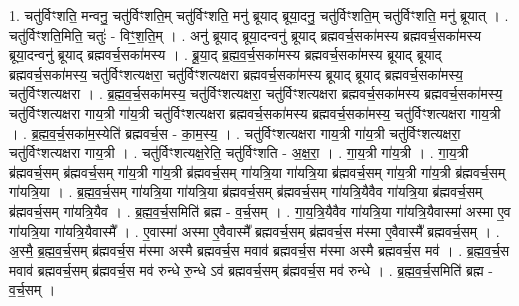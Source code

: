 \documentclass[17pt]{extarticle}
\begin{document}
1. चतु॑र्विꣳशति॒ मन्वनु॒ चतु॑र्विꣳशति॒म् चतु॑र्विꣳशति॒ मनु॑ ब्रूयाद् ब्रूया॒दनु॒ चतु॑र्विꣳशति॒म् चतु॑र्विꣳशति॒ मनु॑ ब्रूयात् । . चतु॑र्विꣳशति॒मिति॒ चतुः॑ - विꣳ॒॒श॒ति॒म् । . अनु॑ ब्रूयाद् ब्रूया॒दन्वनु॑ ब्रूयाद् ब्रह्मवर्च॒सका॑मस्य ब्रह्मवर्च॒सका॑मस्य ब्रूया॒दन्वनु॑ ब्रूयाद् ब्रह्मवर्च॒सका॑मस्य । . ब्रू॒या॒द् ब्र॒ह्म॒व॒र्च॒सका॑मस्य ब्रह्मवर्च॒सका॑मस्य ब्रूयाद् ब्रूयाद् ब्रह्मवर्च॒सका॑मस्य॒ चतु॑र्विꣳशत्यक्षरा॒ चतु॑र्विꣳशत्यक्षरा ब्रह्मवर्च॒सका॑मस्य ब्रूयाद् ब्रूयाद् ब्रह्मवर्च॒सका॑मस्य॒ चतु॑र्विꣳशत्यक्षरा । . ब्र॒ह्म॒व॒र्च॒सका॑मस्य॒ चतु॑र्विꣳशत्यक्षरा॒ चतु॑र्विꣳशत्यक्षरा ब्रह्मवर्च॒सका॑मस्य ब्रह्मवर्च॒सका॑मस्य॒ चतु॑र्विꣳशत्यक्षरा गाय॒त्री गा॑य॒त्री चतु॑र्विꣳशत्यक्षरा ब्रह्मवर्च॒सका॑मस्य ब्रह्मवर्च॒सका॑मस्य॒ चतु॑र्विꣳशत्यक्षरा गाय॒त्री । . ब्र॒ह्म॒व॒र्च॒सका॑म॒स्येति॑ ब्रह्मवर्च॒स - का॒म॒स्य॒ । . चतु॑र्विꣳशत्यक्षरा गाय॒त्री गा॑य॒त्री चतु॑र्विꣳशत्यक्षरा॒ चतु॑र्विꣳशत्यक्षरा गाय॒त्री । . चतु॑र्विꣳशत्यक्ष॒रेति॒ चतु॑र्विꣳशति - अ॒क्ष॒रा॒ । . गा॒य॒त्री गा॑य॒त्री । . गा॒य॒त्री ब्र॑ह्मवर्च॒सम् ब्र॑ह्मवर्च॒सम् गा॑य॒त्री गा॑य॒त्री ब्र॑ह्मवर्च॒सम् गा॑यत्रि॒या गा॑यत्रि॒या ब्र॑ह्मवर्च॒सम् गा॑य॒त्री गा॑य॒त्री ब्र॑ह्मवर्च॒सम् गा॑यत्रि॒या । . ब्र॒ह्म॒व॒र्च॒सम् गा॑यत्रि॒या गा॑यत्रि॒या ब्र॑ह्मवर्च॒सम् ब्र॑ह्मवर्च॒सम् गा॑यत्रि॒यैवैव गा॑यत्रि॒या ब्र॑ह्मवर्च॒सम् ब्र॑ह्मवर्च॒सम् गा॑यत्रि॒यैव । . ब्र॒ह्म॒व॒र्च॒समिति॑ ब्रह्म - व॒र्च॒सम् । . गा॒य॒त्रि॒यैवैव गा॑यत्रि॒या गा॑यत्रि॒यैवास्मा॑ अस्मा ए॒व गा॑यत्रि॒या गा॑यत्रि॒यैवास्मै᳚ । . ए॒वास्मा॑ अस्मा ए॒वैवास्मै᳚ ब्रह्मवर्च॒सम् ब्र॑ह्मवर्च॒स म॑स्मा ए॒वैवास्मै᳚ ब्रह्मवर्च॒सम् । . अ॒स्मै॒ ब्र॒ह्म॒व॒र्च॒सम् ब्र॑ह्मवर्च॒स म॑स्मा अस्मै ब्रह्मवर्च॒स मवाव॑ ब्रह्मवर्च॒स म॑स्मा अस्मै ब्रह्मवर्च॒स मव॑ । . ब्र॒ह्म॒व॒र्च॒स मवाव॑ ब्रह्मवर्च॒सम् ब्र॑ह्मवर्च॒स मव॑ रुन्धे रु॒न्धे ऽव॑ ब्रह्मवर्च॒सम् ब्र॑ह्मवर्च॒स मव॑ रुन्धे । . ब्र॒ह्म॒व॒र्च॒समिति॑ ब्रह्म - व॒र्च॒सम् । \newline
\end{document}
